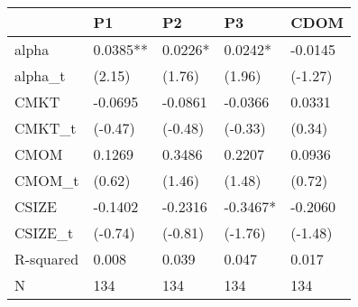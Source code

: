 \begin{tabular}{lllll}
\toprule
 & P1 & P2 & P3 & CDOM \\
\midrule
alpha & 0.0385** & 0.0226* & 0.0242* & -0.0145 \\
alpha_t & (2.15) & (1.76) & (1.96) & (-1.27) \\
CMKT & -0.0695 & -0.0861 & -0.0366 & 0.0331 \\
CMKT_t & (-0.47) & (-0.48) & (-0.33) & (0.34) \\
CMOM & 0.1269 & 0.3486 & 0.2207 & 0.0936 \\
CMOM_t & (0.62) & (1.46) & (1.48) & (0.72) \\
CSIZE & -0.1402 & -0.2316 & -0.3467* & -0.2060 \\
CSIZE_t & (-0.74) & (-0.81) & (-1.76) & (-1.48) \\
R-squared & 0.008 & 0.039 & 0.047 & 0.017 \\
N & 134 & 134 & 134 & 134 \\
\bottomrule
\end{tabular}
